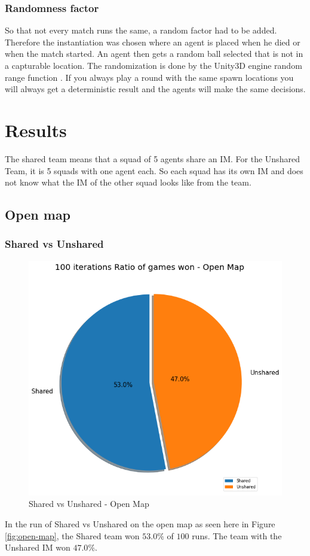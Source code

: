 \documentclass[]{report}
\begin{document}
		\subsection{Randomness factor} \label{ssec:rf}
		So that not every match runs the same, a random factor had to be added. Therefore the instantiation was chosen where an agent is placed when he died or when the match started. An agent then gets a random ball selected that is not in a capturable location. The randomization is done by the Unity3D engine random range function \citep{technologiesUnityRandomRange}. If you always play a round with the same spawn locations you will always get a deterministic result and the agents will make the same decisions.
		
		\clearpage
		\chapter{Results} \label{results}
		The shared team means that a squad of 5 agents share an \ac{IM}. For the Unshared Team, it is 5 squads with one agent each. So each squad has its own \ac{IM} and does not know what the \ac{IM} of the other squad looks like from the team. 
		\section{Open map}
		\subsection{Shared vs Unshared}
		\begin{figure}[h!]
			\centering
			\includegraphics[width=0.9\linewidth]{"Images/100 Games Shared vs Unshared Open Map"}
			\caption[Shared vs Unshared - Open Map]{Shared vs Unshared - Open Map}
			\label{fig:100-games-shared-vs-unshared-open-map}
		\end{figure}
	In the run of Shared vs Unshared on the open map as seen here in Figure \ref{fig:open-map}, the Shared team won $53.0\%$ of $100$ runs. The team with the Unshared \ac{IM} won $47.0\%$.
		
\end{document}
